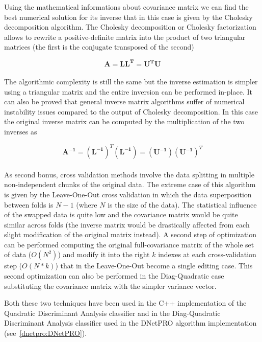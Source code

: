 \documentclass{standalone}
\begin{document}
Using the mathematical informations about covariance matrix we can find the best numerical solution for its inverse that in this case is given by the Cholesky decomposition algorithm.
The Cholesky decomposition or Cholesky factorization allows to rewrite a positive-definite matrix into the product of two triangular matrices (the first is the conjugate transposed of the second)

$$
\mathbf{A} = \mathbf{LL^T} = \mathbf{U^TU}
$$
\\
The algorithmic complexity is still the same but the inverse estimation is simpler using a triangular matrix and the entire inversion can be performed in-place.
It can also be proved that general inverse matrix algorithms suffer of numerical instability issues compared to the output of Cholesky decomposition.
In this case the original inverse matrix can be computed by the multiplication of the two inverses as

$$
\mathbf{A^{-1}} = (\mathbf{L^{-1}})^T(\mathbf{L^{-1}}) = (\mathbf{U^{-1}})(\mathbf{U^{-1}})^T
$$
\\
As second bonus, cross validation methods involve the data splitting in multiple non-independent chunks of the original data.
The extreme case of this algorithm is given by the Leave-One-Out cross validation in which the data superposition between folds is $N-1$ (where $N$ is the size of the data).
The statistical influence of the swapped data is quite low and the covariance matrix would be quite similar across folds (the inverse matrix would be drastically affected from each slight modification of the original matrix instead).
A second step of optimization can be performed computing the original full-covariance matrix of the whole set of data ($O(N^2)$) and modify it into the right $k$ indexes at each cross-validation step ($O(N*k)$) that in the Leave-One-Out become a single editing case.
This second optimization  can also be performed in the Diag-Quadratic case substituting the covariance matrix with the simpler variance vector.


Both these two techniques have been used in the \textsf{C++} implementation of the Quadratic Discriminant Analysis classifier and in the Diag-Quadratic Discriminant Analysis classifier used in the DNetPRO algorithm implementation (see~\ref{dnetpro:DNetPRO}).
\end{document}
